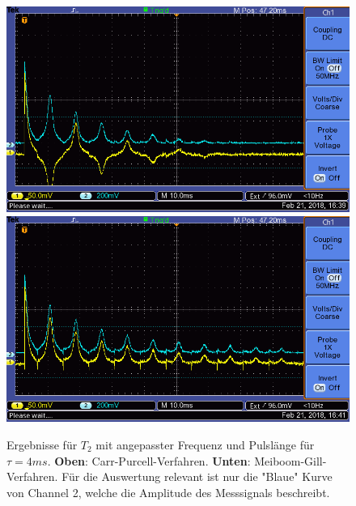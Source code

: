 \documentclass[12pt,a4paper]{article}
\begin{document}
\begin{figure}
\centering
\includegraphics[scale=0.8]{Bilder/T2CPalt.png}
\includegraphics[scale=0.8]{Bilder/T2MGalt.png}
\caption{Ergebnisse für $T_2$ mit angepasster Frequenz und Pulslänge für $\tau = 4ms$. \textbf{Oben}: Carr-Purcell-Verfahren. \textbf{Unten}: Meiboom-Gill-Verfahren. Für die Auswertung relevant ist nur die "Blaue" Kurve von Channel 2, welche die Amplitude des Messsignals beschreibt.}
\label{fig:T2Datenalt}
\end{figure}
\end{document}
